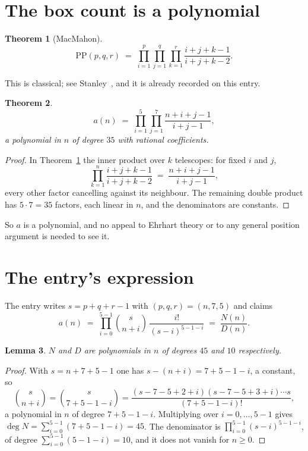 \documentclass[11pt,a4paper]{article}
\theoremstyle{plain}
\newtheorem{theorem}{Theorem}
\newtheorem{lemma}[theorem]{Lemma}
\theoremstyle{definition}
\begin{document}
\section{The box count is a polynomial}

\begin{theorem}[MacMahon]\label{thm:mm}
\[
\mathrm{PP}(p,q,r)\;=\;\prod_{i=1}^{p}\prod_{j=1}^{q}\prod_{k=1}^{r}
\frac{i+j+k-1}{i+j+k-2} .
\]
\end{theorem}

This is classical; see Stanley~\cite{stanley}, and it is already recorded on this entry.

\begin{theorem}\label{thm:poly}
\[
a(n)\;=\;\prod_{i=1}^{5}\prod_{j=1}^{7}\frac{n+i+j-1}{i+j-1},
\]
a polynomial in $n$ of degree $35$ with rational coefficients.
\end{theorem}

\begin{proof}
In Theorem~\ref{thm:mm} the inner product over $k$ telescopes: for fixed $i$ and $j$,
\[
\prod_{k=1}^{n}\frac{i+j+k-1}{i+j+k-2}\;=\;\frac{n+i+j-1}{i+j-1} ,
\]
every other factor cancelling against its neighbour. The remaining double product has
$5\cdot7=35$ factors, each linear in $n$, and the denominators are constants.
\end{proof}

So $a$ is a polynomial, and no appeal to Ehrhart theory or to any general position argument is
needed to see it.

\section{The entry's expression}

The entry writes $s=p+q+r-1$ with $(p,q,r)=(n,7,5)$ and claims
\[
a(n)\;=\;\prod_{i=0}^{5-1}\binom{s}{n+i}\,\frac{i!}{(s-i)^{5-1-i}}\;=\;
\frac{N(n)}{D(n)} .
\]

\begin{lemma}\label{lem:deg}
$N$ and $D$ are polynomials in $n$ of degrees $45$ and $10$ respectively.
\end{lemma}

\begin{proof}
With $s=n+7+5-1$ one has $s-(n+i)=7+5-1-i$, a constant, so
\[
\binom{s}{n+i}=\binom{s}{7+5-1-i}
=\frac{(s-7-5+2+i)(s-7-5+3+i)\cdots s}{(7+5-1-i)!},
\]
a polynomial in $n$ of degree $7+5-1-i$. Multiplying over $i=0,\dots,5-1$ gives
$\deg N=\sum_{i=0}^{5-1}(7+5-1-i)=45$. The denominator is
$\prod_{i=0}^{5-1}(s-i)^{5-1-i}$, of degree
$\sum_{i=0}^{5-1}(5-1-i)=10$, and it does not vanish for $n\ge0$.
\end{proof}
\end{document}
